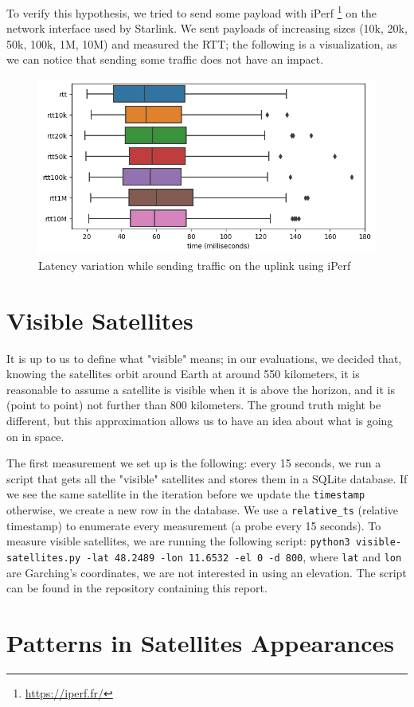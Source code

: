 \documentclass[IN,11pt,twoside,openright,idp,english]{tumthesis}
\begin{document}
To verify this hypothesis, we tried to send some payload with iPerf \footnote{\url{https://iperf.fr/}} on the network interface used by Starlink. We sent payloads of increasing sizes (10k, 20k, 50k, 100k, 1M, 10M) and measured the RTT; the following is a visualization, as we can notice that sending some traffic does not have an impact.

\begin{figure}
    \centering
    \includegraphics[width=0.6\columnwidth]{img/latency_iperf.png}
    \caption{Latency variation while sending traffic on the uplink using iPerf}
\end{figure}

\section{Visible Satellites}

It is up to us to define what "visible" means; in our evaluations, we decided that, knowing the satellites orbit around Earth at around 550 kilometers, it is reasonable to assume a satellite is visible when it is above the horizon, and it is (point to point) not further than 800 kilometers. The ground truth might be different, but this approximation allows us to have an idea about what is going on in space. 

The first measurement we set up is the following: every 15 seconds, we run a script that gets all the "visible" satellites and stores them in a SQLite database. If we see the same satellite in the iteration before we update the \texttt{timestamp} otherwise, we create a new row in the database. We use a \texttt{relative\_ts} (relative timestamp) to enumerate every measurement (a probe every 15 seconds). To measure visible satellites, we are running the following script: \texttt{python3 visible-satellites.py -lat 48.2489 -lon 11.6532 -el 0 -d 800}, where \texttt{lat} and \texttt{lon} are Garching's coordinates, we are not interested in using an elevation. The script can be found in the repository containing this report.


\section{Patterns in Satellites Appearances}
\end{document}
